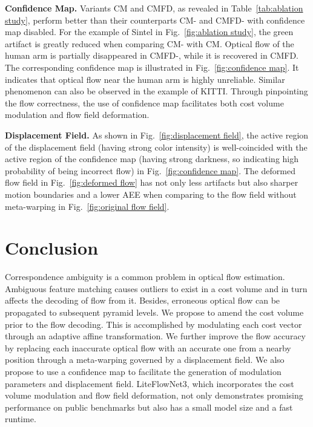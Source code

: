 \documentclass[runningheads]{llncs}
\begin{document}
\noindent\textbf{Confidence Map.} Variants CM and CMFD, as revealed in Table~\ref{tab:ablation study}, perform better than their counterparts CM- and CMFD- with confidence map disabled.
For the example of Sintel in Fig.~\ref{fig:ablation study}, the green artifact is greatly reduced when comparing CM- with CM. 
Optical flow of the human arm is partially disappeared in CMFD-, while it is recovered in CMFD. The corresponding confidence map is illustrated in Fig.~\ref{fig:confidence map}. It indicates that optical flow near the human arm is highly unreliable.
Similar phenomenon can also be observed in the example of KITTI.
Through pinpointing the flow correctness, the use of confidence map facilitates both cost volume modulation and flow field deformation.

\noindent\textbf{Displacement Field.} As shown in Fig.~\ref{fig:displacement field}, the active region of the displacement field (having strong color intensity) is well-coincided with the active region of the confidence map (having strong darkness, so indicating high probability of being incorrect flow) in Fig.~\ref{fig:confidence map}. 
The deformed flow field in Fig.~\ref{fig:deformed flow} has not only less artifacts but also sharper motion boundaries and a lower AEE when comparing to the flow field without meta-warping in Fig.~\ref{fig:original flow field}.

\section{Conclusion}
Correspondence ambiguity is a common problem in optical flow estimation. Ambiguous feature matching causes outliers to exist in a cost volume and in turn affects the decoding of flow from it. Besides, erroneous optical flow can be propagated to subsequent pyramid levels.
We propose to amend the cost volume prior to the flow decoding. This is accomplished by modulating each cost vector through an adaptive affine transformation. 
We further improve the flow accuracy by replacing each inaccurate optical flow with an accurate one from a nearby position through a meta-warping governed by a displacement field. 
We also propose to use a confidence map to facilitate the generation of modulation parameters and displacement field.
LiteFlowNet3, which incorporates the cost volume modulation and flow field deformation, not only demonstrates promising performance on public benchmarks but also has a small model size and a fast runtime.

\clearpage


\end{document}
